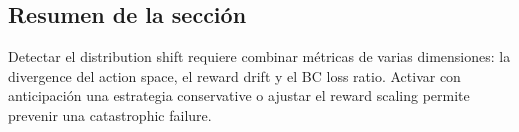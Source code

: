 \subsection{Resumen de la sección}

Detectar el distribution shift requiere combinar métricas de varias dimensiones: la divergence del action space, el reward drift y el BC loss ratio. Activar con anticipación una estrategia conservative o ajustar el reward scaling permite prevenir una catastrophic failure.

